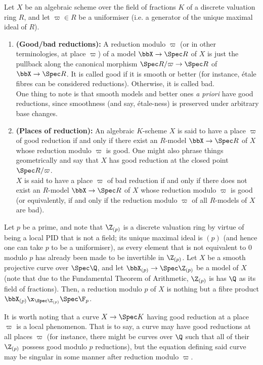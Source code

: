        \begin{definition}
            Let $X$ be an algebraic scheme over the field of fractions $K$ of a discrete valuation ring $R$, and let $\varpi \in R$ be a uniformiser (i.e. a generator of the unique maximal ideal of $R$). 
            \begin{enumerate}
                \item \textbf{(Good/bad reductions):} A reduction modulo $\varpi$ (or in other terminologies, at place $\varpi$) of a model $\bbX \to \Spec R$ of $X$ is just the pullback along the canonical morphism $\Spec R/\varpi \to \Spec R$ of $\bbX \to \Spec R$. It is called good if it is smooth or better (for instance, \'etale fibres can be considered  reductions). Otherwise, it is called bad.
                \\
                One thing to note is that smooth models and better ones \textit{a priori} have good reductions, since smoothness (and say, \'etale-ness) is preserved under arbitrary base changes.
                \item \textbf{(Places of reduction):} An algebraic $K$-scheme $X$ is said to have a place $\varpi$ of good reduction if and only if there exist an $R$-model $\bbX \to \Spec R$ of $X$ whose reduction modulo $\varpi$ is good. One might also phrase things geometrically and say that $X$ has good reduction at the closed point $\Spec R/\varpi$.
                \\
                $X$ is said to have a place $\varpi$ of bad reduction if and only if there does not exist an $R$-model $\bbX \to \Spec R$ of $X$ whose reduction modulo $\varpi$ is good (or equivalently, if and only if the reduction modulo $\varpi$ of all $R$-models of $X$ are bad).
            \end{enumerate}
        \end{definition}
        \begin{example}
            Let $p$ be a prime, and note that $\Z_{(p)}$ is a discrete valuation ring by virtue of being a local PID that is not a field; its unique maximal ideal is $(p)$ (and hence one can take $p$ to be a uniformiser), as every element that is not equivalent to $0$ modulo $p$ has already been made to be invertible in $\Z_{(p)}$. Let $X$ be a smooth projective curve over $\Spec \Q$, and let $\bbX_{(p)} \to \Spec \Z_{(p)}$ be a model of $X$ (note that due to the Fundamental Theorem of Arithmetic, $\Z_{(p)}$ is has $\Q$ as its field of fractions). Then, a reduction modulo $p$ of $X$ is nothing but a fibre product $\bbX_{(p)} \x_{\Spec \Z_{(p)}} \Spec \F_p$. 
        \end{example}
        \begin{remark}
            It is worth noting that a curve $X \to \Spec K$ having good reduction at a place $\varpi$ is a local phenomenon. That is to say, a curve may have good reductions at all places $\varpi$ (for instance, there might be curves over $\Q$ such that all of their $\Z_{(p)}$ possess good modulo $p$ reductions), but the equation defining said curve may be singular in some manner after reduction modulo $\varpi$. 
        \end{remark}
        
